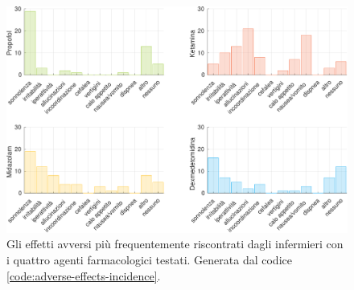 \vfill

\vfill


\begin{figure}[!h]
    \centering
    \includegraphics[width=1\textwidth]{Figure/effetti-avversi.pdf}
    \caption{Gli effetti avversi più frequentemente riscontrati dagli infermieri con i quattro agenti farmacologici testati. Generata dal codice \ref{code:adverse-effects-incidence}.}
    \label{fig:sicurezza}
\end{figure}


